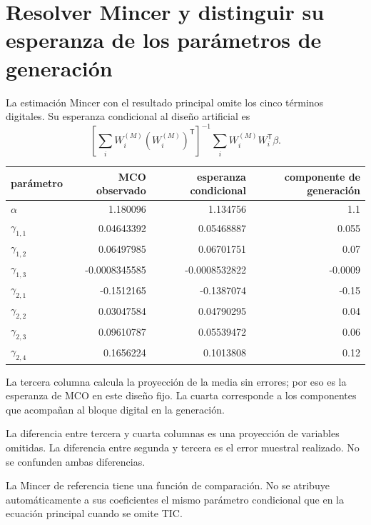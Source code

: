 \documentclass[11pt,a4paper]{article}
\begin{document}
\clearpage
\section{Resolver Mincer y distinguir su esperanza de los parámetros de generación}
La estimación Mincer con el resultado principal omite los cinco términos digitales. Su esperanza condicional al diseño artificial es
\[
\left[\sum_iW_i^{(M)}(W_i^{(M)})^{\mathsf T}\right]^{-1}\sum_iW_i^{(M)}W_i^{\mathsf T}\beta.
\]

\begin{center}\small
\begin{tabular}{lrrr}
\toprule
parámetro & MCO observado & esperanza condicional & componente de generación\\\midrule
$\alpha$ & 1.180096 & 1.134756 & 1.1\\
$\gamma_{1,1}$ & 0.04643392 & 0.05468887 & 0.055\\
$\gamma_{1,2}$ & 0.06497985 & 0.06701751 & 0.07\\
$\gamma_{1,3}$ & -0.0008345585 & -0.0008532822 & -0.0009\\
$\gamma_{2,1}$ & -0.1512165 & -0.1387074 & -0.15\\
$\gamma_{2,2}$ & 0.03047584 & 0.04790295 & 0.04\\
$\gamma_{2,3}$ & 0.09610787 & 0.05539472 & 0.06\\
$\gamma_{2,4}$ & 0.1656224 & 0.1013808 & 0.12\\
\bottomrule
\end{tabular}\end{center}

La tercera columna calcula la proyección de la media sin errores; por eso es la esperanza de MCO en este diseño fijo. La cuarta corresponde a los componentes que acompañan al bloque digital en la generación.

La diferencia entre tercera y cuarta columnas es una proyección de variables omitidas. La diferencia entre segunda y tercera es el error muestral realizado. No se confunden ambas diferencias.

La Mincer de referencia tiene una función de comparación. No se atribuye automáticamente a sus coeficientes el mismo parámetro condicional que en la ecuación principal cuando se omite TIC.

\clearpage
\end{document}

